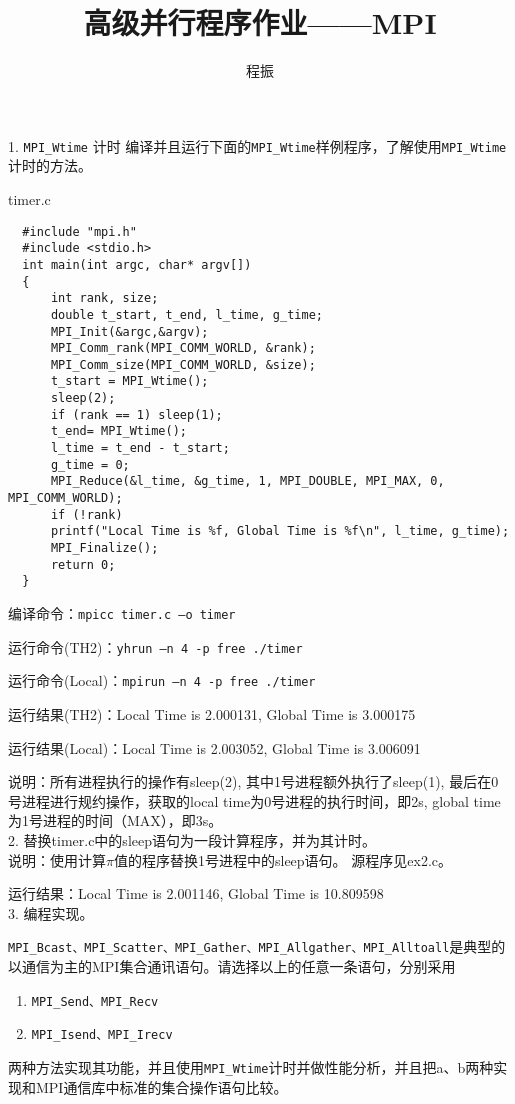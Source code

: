 \documentclass{ctexart}
\author{程振}
\title{高级并行程序作业——MPI}
\begin{document}
\maketitle

1. \lstinline{MPI_Wtime} 计时
编译并且运行下面的\lstinline{MPI_Wtime}样例程序，了解使用\lstinline{MPI_Wtime}计时的方法。

timer.c
\lstset{language=C}
\begin{lstlisting}
  #include "mpi.h"
  #include <stdio.h>
  int main(int argc, char* argv[])
  {
      int rank, size;
      double t_start, t_end, l_time, g_time;
      MPI_Init(&argc,&argv);
      MPI_Comm_rank(MPI_COMM_WORLD, &rank);
      MPI_Comm_size(MPI_COMM_WORLD, &size);
      t_start = MPI_Wtime();
      sleep(2);
      if (rank == 1) sleep(1);
      t_end= MPI_Wtime();
      l_time = t_end - t_start;
      g_time = 0;
      MPI_Reduce(&l_time, &g_time, 1, MPI_DOUBLE, MPI_MAX, 0, MPI_COMM_WORLD);
      if (!rank) 
      printf("Local Time is %f, Global Time is %f\n", l_time, g_time);
      MPI_Finalize();
      return 0;
  }
\end{lstlisting}

编译命令：\lstinline{mpicc timer.c –o timer}

运行命令(TH2)：\lstinline{yhrun –n 4 -p free ./timer}

运行命令(Local)：\lstinline{mpirun –n 4 -p free ./timer}

运行结果(TH2)：Local Time is 2.000131, Global Time is 3.000175

运行结果(Local)：Local Time is 2.003052, Global Time is 3.006091

说明：所有进程执行的操作有sleep(2), 其中1号进程额外执行了sleep(1),
最后在0号进程进行规约操作，获取的local time为0号进程的执行时间，即2s,
global time为1号进程的时间（MAX），即3s。
\\

2. 替换timer.c中的sleep语句为一段计算程序，并为其计时。
\\

说明：使用计算$\pi$值的程序替换1号进程中的sleep语句。
源程序见ex2.c。

运行结果：Local Time is 2.001146, Global Time is 10.809598
\\

3. 编程实现。

\lstinline{MPI_Bcast、MPI_Scatter、MPI_Gather、MPI_Allgather、MPI_Alltoall}是典型的以通信为主的MPI集合通讯语句。请选择以上的任意一条语句，分别采用
\begin{enumerate}[label=(\alph*)]
    \item \lstinline{MPI_Send、MPI_Recv}
    \item \lstinline{MPI_Isend、MPI_Irecv}
\end{enumerate}
两种方法实现其功能，并且使用\lstinline{MPI_Wtime}计时并做性能分析，并且把a、b两种实现和MPI通信库中标准的集合操作语句比较。
\end{document}
